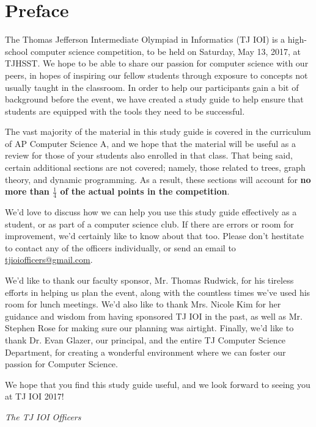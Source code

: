 \chapter{Preface}

The Thomas Jefferson Intermediate Olympiad in Informatics (TJ IOI) is a high-school computer science competition, to be held on Saturday, May 13, 2017, at TJHSST.  We hope to be able to share our passion for computer science with our peers, in hopes of inspiring our fellow students through exposure to concepts not usually taught in the classroom.  In order to help our participants gain a bit of background before the event, we have created a study guide to help ensure that students are equipped with the tools they need to be successful.

The vast majority of the material in this study guide is covered in the curriculum of AP Computer Science A, and we hope that the material will be useful as a review for those of your students also enrolled in that class. That being said, certain additional sections are not covered; namely, those related to trees, graph theory, and dynamic programming. As a result, these sections will account for \textbf{no more than $\frac{1}{4}$ of the actual points in the competition}.

We'd love to discuss how we can help you use this study guide effectively as a student, or as part of a computer science club. If there are errors or room for improvement, we'd certainly like to know about that too. Please don't hestitate to contact any of the officers individually, or send an email to \href{mailto:tjioiofficers@gmail.com}{tjioiofficers@gmail.com}.

We'd like to thank our faculty sponsor, Mr. Thomas Rudwick, for his tireless efforts in helping us plan the event, along with the countless times we've used his room for lunch meetings. We'd also like to thank Mrs. Nicole Kim for her guidance and wisdom from having sponsored TJ IOI in the past, as well as Mr. Stephen Rose for making sure our planning was airtight. Finally, we'd like to thank Dr. Evan Glazer, our principal, and the entire TJ Computer Science Department, for creating a wonderful environment where we can foster our passion for Computer Science.

We hope that you find this study guide useful, and we look forward to seeing you at TJ IOI 2017!

\noindent\textit{The TJ IOI Officers} \\
